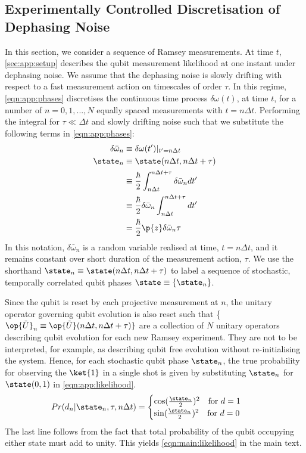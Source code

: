 \subsection{Experimentally Controlled Discretisation of Dephasing Noise \label{sec:app:exptres}} 
 In this section, we consider a sequence of Ramsey measurements. At time $t$, \cref{sec:app:setup} describes the qubit measurement likelihood at one instant under dephasing noise. We assume that the dephasing noise is slowly drifting with respect to a fast measurement action on timescales of order $\tau$. In this regime, \cref{eqn:app:phases} discretises the continuous time process $\delta\omega(t)$, at time $t$, for a number of $n= 0, 1, ..., N$ equally spaced measurements with $t = n \Delta t$. Performing the integral for $\tau \ll \Delta t$ and slowly drifting noise such that we substitute the following terms in \cref{eqn:app:phases}:
\begin{align}
\delta\bar{\omega}_n &\equiv \delta\omega(t')|_{t'=n \Delta t } \\
\state_n &\equiv \state(n\Delta t, n\Delta t + \tau) \\
& \equiv \frac{\hbar}{2}  \int_{n\Delta t}^{n\Delta t + \tau} \delta\bar{\omega}_n dt' \\
& \equiv \frac{\hbar}{2}  \delta\bar{\omega}_n \int_{n\Delta t}^{n\Delta t + \tau}  dt' \\
& = \frac{\hbar}{2}\p{z}\delta\bar{\omega}_n \tau \label{eqn:app:phases_constantdetuning}
\end{align}
In this notation, $\delta\bar{\omega}_n $ is a random variable realised at time, $t = n \Delta t$, and it remains constant over short duration of the measurement action, $\tau$.  We use the shorthand $\state_n \equiv \state(n\Delta t, n\Delta t + \tau)$ to label a sequence of stochastic, temporally correlated qubit phases $ \state \equiv \{\state_n \}$. 

Since the qubit is reset by each projective measurement at $n$, the unitary operator governing qubit evolution is also reset such that \{$\op{\tilde{U}}_n \equiv \op{\tilde{U}}(n\Delta t, n\Delta t + \tau) \}$ are a collection of $N$ unitary operators describing qubit evolution for each new Ramsey experiment. They are not to be interpreted, for example, as describing qubit free evolution without re-initialising the system. Hence, for each stochastic qubit phase $\state_n$, the true probability for observing the $\ket{1}$ in a single shot is given by substituting $\state_n $ for $ \state(0,1)$ in \cref{eqn:app:likelihood}.
\begin{align}
Pr(d_n | \state_n, \tau, n \Delta t) &= \begin{cases} \cos(\frac{\state_{n}}{2})^2 \quad \text{for $d=1$} \\   \sin(\frac{\state_{n}}{2})^2  \quad \text{for $ d=0$} \end{cases} 
\end{align}
The last line follows from the fact that total probability of the qubit occupying either state must add to unity. This yields \cref{eqn:main:likelihood} in the main text.


